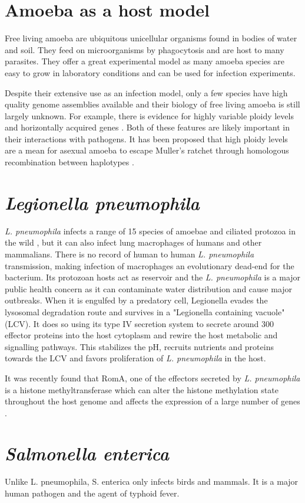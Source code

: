 \section{Amoeba as a host model}

Free living amoeba are ubiquitous unicellular organisms found in bodies of water and soil. They feed on microorganisms by phagocytosis and are host to many parasites. They offer a great experimental model as many amoeba species are easy to grow in laboratory conditions and can be used for infection experiments.

Despite their extensive use as an infection model, only a few species have high quality genome assemblies available and their biology of free living amoeba is still largely unknown. For example, there is evidence for highly variable ploidy levels and horizontally acquired genes \cite{clarke2013}. Both of these features are likely important in their interactions with pathogens. It has been proposed that high ploidy levels are a mean for asexual amoeba to escape Muller's ratchet through homologous recombination between haplotypes \cite{Maciver2016}.

\section{\textit{Legionella pneumophila}}

\textit{L. pneumophila} infects a range of 15 species of amoebae and ciliated protozoa in the wild \cite{Rowbotham1980}, but it can also infect lung macrophages of humans and other mammalians.
There is no record of human to human \textit{L. pneumophila} transmission, making infection of macrophages an evolutionary dead-end for the bacterium. Its protozoan hosts act as reservoir and the \textit{L. pneumophila} is a major public health concern as it can contaminate water distribution and cause major outbreaks. When it is engulfed by a predatory cell, Legionella evades the lysosomal degradation route and survives in a "Legionella containing vacuole" (LCV). It does so using its type IV secretion system to secrete around 300 effector proteins into the host cytoplasm and rewire the host metabolic and signalling pathways. This stabilizes the pH, recruits nutrients and proteins towards the LCV and favors proliferation of \textit{L. pneumophila} in the host.

It was recently found that RomA, one of the effectors secreted by \textit{L. pneumophila} is a histone methyltransferase which can alter the histone methylation state throughout the host genome and affects the expression of a large number of genes \cite{Rolando2013}.

\section{\textit{Salmonella enterica}}

Unlike {L. pneumophila}, {S. enterica} only infects birds and mammals. It is a major human pathogen and the agent of typhoid fever.
